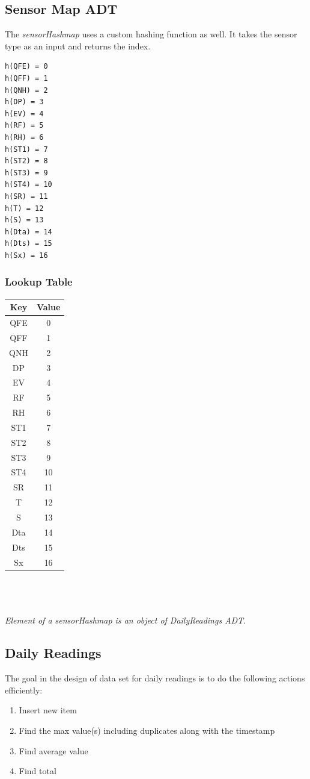 \documentclass[12pt]{article}
\begin{document}
\subsection{Sensor Map ADT}
The {\em sensorHashmap} uses a custom hashing function as well. It takes the sensor type as an input and returns the index.
\begin{lstlisting}
h(QFE) = 0
h(QFF) = 1
h(QNH) = 2
h(DP) = 3
h(EV) = 4
h(RF) = 5
h(RH) = 6
h(ST1) = 7
h(ST2) = 8
h(ST3) = 9
h(ST4) = 10
h(SR) = 11
h(T) = 12
h(S) = 13
h(Dta) = 14
h(Dts) = 15
h(Sx) = 16
\end{lstlisting}
\subsubsection{Lookup Table}
\begin{tabular}{| c | c |}
	\hline
	Key & Value \\
	\hline
	QFE & 0 \\
	\hline
	QFF & 1 \\
	\hline
	QNH & 2 \\
	\hline
	DP & 3 \\
	\hline
	EV & 4 \\
	\hline
	RF & 5 \\
	\hline
	RH & 6 \\
	\hline
	ST1 & 7 \\
	\hline
	ST2 & 8 \\
	\hline
	ST3 & 9 \\
	\hline
	ST4 & 10 \\
	\hline
	SR  & 11 \\
	\hline
	T & 12 \\
	\hline
	S & 13 \\
	\hline
	Dta & 14 \\
	\hline
	Dts & 15 \\
	\hline
	Sx & 16 \\
	\hline
\end{tabular}
\\ \\ \\
{\em Element of a sensorHashmap is an object of DailyReadings ADT.}
\subsection{Daily Readings}
The goal in the design of data set for daily readings is to do the following actions efficiently:  
\begin{enumerate}
	\item Insert new item
	\item Find the max value(s) including duplicates along with the timestamp
	\item Find average value
	\item Find total
\end{enumerate}
\end{document}
